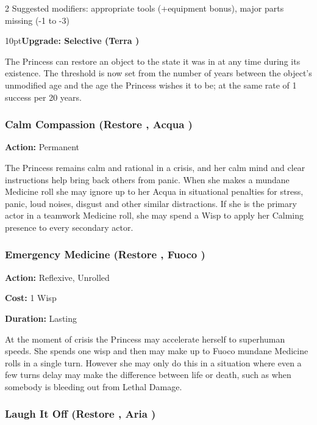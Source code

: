 \begin{multicols}{2}
Suggested modifiers: appropriate tools (+equipment bonus), major parts missing (-1 to -3)
\begin{myindentpar}{10pt}\textbf{Upgrade: Selective (Terra \textbullet\textbullet)}

The Princess can restore an object to the state it was in at any time during its existence. The threshold is now set from the number of years between the object's unmodified age and the age the Princess wishes it to be; at the same rate of 1 success per 20 years.\end{myindentpar}

\subsubsection*{Calm Compassion (Restore \textbullet, Acqua \textbullet)}

\noindent \textbf{Action:} Permanent 

\noindent The Princess remains calm and rational in a crisis, and her calm mind and clear instructions help bring back others from panic. When she makes a mundane Medicine roll she may ignore up to her Acqua in situational penalties for stress, panic, loud noises, disgust and other similar distractions. If she is the primary actor in a teamwork Medicine roll, she may spend a Wisp to apply her Calming presence to every secondary actor.

\subsubsection*{Emergency Medicine (Restore \textbullet, Fuoco \textbullet)}

\noindent \textbf{Action:} Reflexive, Unrolled

\noindent \textbf{Cost:} 1 Wisp

\noindent \textbf{Duration:} Lasting

\noindent At the moment of crisis the Princess may accelerate herself to superhuman speeds. She spends one wisp and then may make up to Fuoco mundane Medicine rolls in a single turn. However she may only do this in a situation where even a few turns delay may make the difference between life or death, such as when somebody is bleeding out from Lethal Damage. 

\subsubsection*{Laugh It Off (Restore \textbullet, Aria \textbullet)}


\end{multicols}
